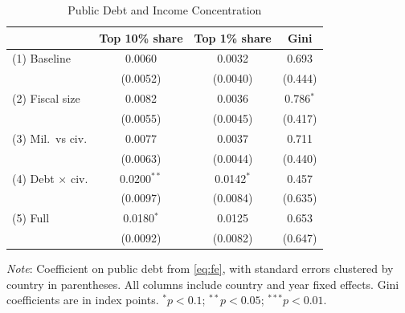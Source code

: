 \documentclass[12pt, titlepage]{article}
\numberwithin{equation}{section}
\begin{document}
\begin{table}[htbp]
	\centering
	\begin{threeparttable}
		\caption{Public Debt and Income Concentration}
		\label{table:fe_debt}
		\begin{small}
			\begin{tabular}{lccc}
				\toprule
				& Top 10\% share & Top 1\% share & Gini \\
				\midrule
				(1) Baseline & 0.0060\phantom{$^{***}$} & 0.0032\phantom{$^{***}$} & 0.693\phantom{$^{***}$} \\
				& (0.0052) & (0.0040) & (0.444) \\
				\addlinespace
				(2) Fiscal size & 0.0082\phantom{$^{***}$} & 0.0036\phantom{$^{***}$} & 0.786$^{*}$\phantom{$^{**}$} \\
				& (0.0055) & (0.0045) & (0.417) \\
				\addlinespace
				(3) Mil.\ vs civ. & 0.0077\phantom{$^{***}$} & 0.0037\phantom{$^{***}$} & 0.711\phantom{$^{***}$} \\
				& (0.0063) & (0.0044) & (0.440) \\
				\addlinespace
				(4) Debt $\times$ civ. & 0.0200$^{**}$\phantom{$^{*}$} & 0.0142$^{*}$\phantom{$^{**}$} & 0.457\phantom{$^{***}$} \\
				& (0.0097) & (0.0084) & (0.635) \\
				\addlinespace
				(5) Full & 0.0180$^{*}$\phantom{$^{**}$} & 0.0125\phantom{$^{***}$} & 0.653\phantom{$^{***}$} \\
				& (0.0092) & (0.0082) & (0.647) \\
				\bottomrule
			\end{tabular}
		\end{small}
		\begin{tablenotes}
			\footnotesize
			\item \emph{Note}: Coefficient on public debt from \eqref{eq:fe}, with
			standard errors clustered by country in parentheses. All columns include
			country and year fixed effects. Gini coefficients are in index points.
			$^{*}p<0.1$; $^{**}p<0.05$; $^{***}p<0.01$.
		\end{tablenotes}
	\end{threeparttable}
\end{table}
\end{document}
